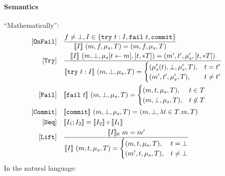 \documentclass{../../psv}
\begin{document}
  \paragraph{Semantics} ``Mathematically'':
  \begin{align*}
    \mathtt{[OnFail]}\hspace{1em} & \frac{f \not= \bot, I \in \{\mathtt{try}\ t: I, \mathtt{fail}\ t, \mathtt{commit}\}}{\llbracket I\rrbracket\ (m, f, \mu_s, T) = (m, f, \mu_s, T)}\\
    \mathtt{[Try]}\hspace{1em} & \frac{\llbracket I\rrbracket\ (m, \bot, \mu_s[t \gets m], [t, *T]) = (m', t', \mu_s', [t, *T])}{\llbracket\mathtt{try}\ t: I\rrbracket\ (m, \bot, \mu_s, T) = \begin{cases}
      (\mu_s'(t), \bot, \mu_s', T), & t = t'\\
      (m', t', \mu_s', T), & t \not= t'
    \end{cases}}\\
    \mathtt{[Fail]}\hspace{1em} &\llbracket\mathtt{fail}\ t\rrbracket\ (m, \bot, \mu_s, T) = \begin{cases}
      (m, t, \mu_s, T), & t \in T\\
      (m, \bot, \mu_s, T), & t \not\in T
    \end{cases}\\
    \mathtt{[Commit]}\hspace{1em} &\llbracket\mathtt{commit}\rrbracket\ (m, \bot, \mu_s, T) = (m, \bot, \lambda {t \in T}. m, T)\\
    \mathtt{[Seq]}\hspace{1em} &\llbracket I_1; I_2\rrbracket = \llbracket I_2\rrbracket \circ \llbracket I_1\rrbracket\\
    \mathtt{[Lift]}\hspace{1em} &\frac{\llbracket I\rrbracket_0\ m = m'}{\llbracket I\rrbracket\ (m, t, \mu_s, T) = \begin{cases}
      (m, t, \mu_s, T), & t = \bot\\
      (m', t, \mu_s, T), & t \not= \bot
    \end{cases}}
  \end{align*}
  In the natural language:
\end{document}
